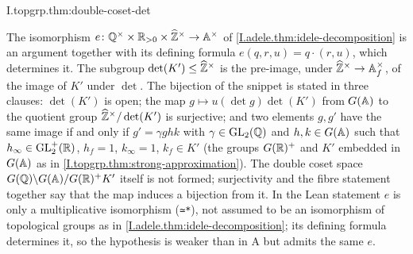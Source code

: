 \begin{tfformal}{I.topgrp.thm:double-coset-det}
\begin{tffidelity}
The isomorphism $e\colon\mathbb{Q}^\times\times\mathbb{R}_{>0}\times\widehat{\mathbb{Z}}^\times\to\mathbb{A}^\times$ of \cref{I.adele.thm:idele-decomposition} is an argument together with its defining formula $e(q,r,u)=q\cdot(r,u)$, which determines it. The subgroup $\det(K')\le\widehat{\mathbb{Z}}^\times$ is the pre-image, under $\widehat{\mathbb{Z}}^\times\to\mathbb{A}_f^\times$, of the image of $K'$ under $\det$. The bijection of the snippet is stated in three clauses: $\det(K')$ is open; the map $g\mapsto u(\det g)\det(K')$ from $G(\mathbb{A})$ to the quotient group $\widehat{\mathbb{Z}}^\times/\det(K')$ is surjective; and two elements $g,g'$ have the same image if and only if $g'=\gamma g h k$ with $\gamma\in\mathrm{GL}_2(\mathbb{Q})$ and $h,k\in G(\mathbb{A})$ such that $h_\infty\in\mathrm{GL}_2^+(\mathbb{R})$, $h_f=1$, $k_\infty=1$, $k_f\in K'$ (the groups $G(\mathbb{R})^+$ and $K'$ embedded in $G(\mathbb{A})$ as in \cref{I.topgrp.thm:strong-approximation}). The double coset space $G(\mathbb{Q})\backslash G(\mathbb{A})/G(\mathbb{R})^+K'$ itself is not formed; surjectivity and the fibre statement together say that the map induces a bijection from it. In the Lean statement $e$ is only a multiplicative isomorphism (\texttt{≃*}), not assumed to be an isomorphism of topological groups as in \cref{I.adele.thm:idele-decomposition}; its defining formula determines it, so the hypothesis is weaker than in A but admits the same $e$.
\end{tffidelity}
\end{tfformal}
